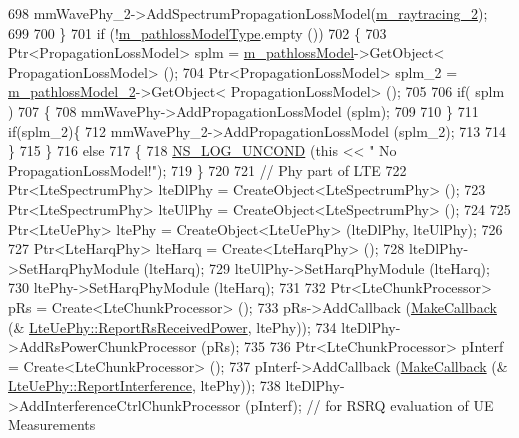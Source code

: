 \begin{DoxyCode}
698                 mmWavePhy\_2->AddSpectrumPropagationLossModel(\hyperlink{classns3_1_1MmWaveHelper_a4fcc697a0b40deaa9bd75ead1c4297d9}{m\_raytracing\_2});
699 
700         \}
701         \textcolor{keywordflow}{if} (!\hyperlink{classns3_1_1MmWaveHelper_a7f17e9bc4797b51d9a31d16c7e667960}{m\_pathlossModelType}.empty ())
702         \{
703                 Ptr<PropagationLossModel> splm = \hyperlink{classns3_1_1MmWaveHelper_a4de60027f5a256fe51033e6d6803e9b0}{m\_pathlossModel}->GetObject<
      PropagationLossModel> ();
704                 Ptr<PropagationLossModel> splm\_2 = \hyperlink{classns3_1_1MmWaveHelper_a463070ab19ee9776262439eda4edf3e2}{m\_pathlossModel\_2}->GetObject<
      PropagationLossModel> ();
705 
706                 \textcolor{keywordflow}{if}( splm )
707                 \{
708                         mmWavePhy->AddPropagationLossModel (splm);
709 
710                 \}
711                 \textcolor{keywordflow}{if}(splm\_2)\{
712                         mmWavePhy\_2->AddPropagationLossModel (splm\_2);
713 
714                 \}
715         \}
716         \textcolor{keywordflow}{else}
717         \{
718                 \hyperlink{log-macros-disabled_8h_a0b36e5e182b37194f85ef1c5e979fb2e}{NS\_LOG\_UNCOND} (\textcolor{keyword}{this} << \textcolor{stringliteral}{" No PropagationLossModel!"});
719         \}
720 
721         \textcolor{comment}{// Phy part of LTE}
722         Ptr<LteSpectrumPhy> lteDlPhy = CreateObject<LteSpectrumPhy> ();
723         Ptr<LteSpectrumPhy> lteUlPhy = CreateObject<LteSpectrumPhy> ();
724 
725         Ptr<LteUePhy> ltePhy = CreateObject<LteUePhy> (lteDlPhy, lteUlPhy);
726 
727         Ptr<LteHarqPhy> lteHarq = Create<LteHarqPhy> ();
728         lteDlPhy->SetHarqPhyModule (lteHarq);
729         lteUlPhy->SetHarqPhyModule (lteHarq);
730         ltePhy->SetHarqPhyModule (lteHarq);
731 
732         Ptr<LteChunkProcessor> pRs = Create<LteChunkProcessor> ();
733         pRs->AddCallback (\hyperlink{group__makecallbackmemptr_ga9376283685aa99d204048d6a4b7610a4}{MakeCallback} (&
      \hyperlink{classns3_1_1LteUePhy_aca025f112e83d159f7a1b0fb822d77b6}{LteUePhy::ReportRsReceivedPower}, ltePhy));
734         lteDlPhy->AddRsPowerChunkProcessor (pRs);
735 
736         Ptr<LteChunkProcessor> pInterf = Create<LteChunkProcessor> ();
737         pInterf->AddCallback (\hyperlink{group__makecallbackmemptr_ga9376283685aa99d204048d6a4b7610a4}{MakeCallback} (&
      \hyperlink{classns3_1_1LteUePhy_aac25482ac025b043e7d0516927984720}{LteUePhy::ReportInterference}, ltePhy));
738         lteDlPhy->AddInterferenceCtrlChunkProcessor (pInterf); \textcolor{comment}{// for RSRQ evaluation of UE Measurements}

\end{DoxyCode}
